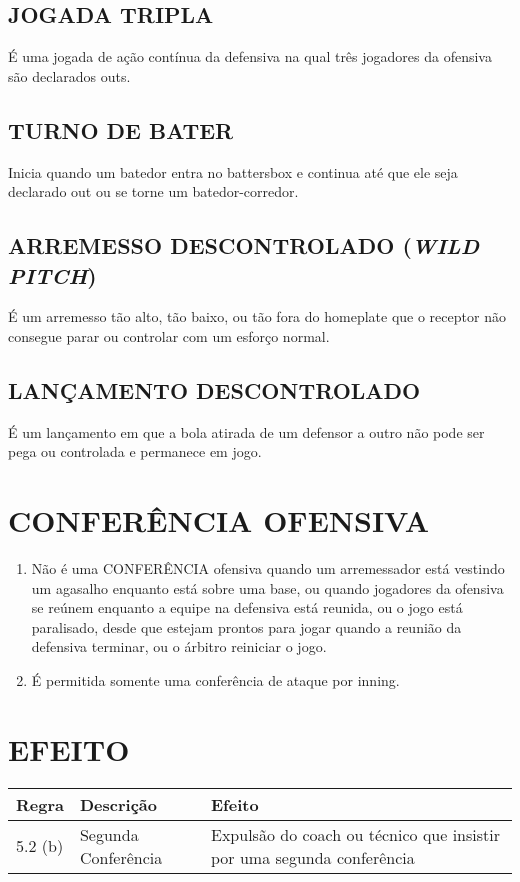 \subsection{JOGADA TRIPLA}
É uma jogada de ação contínua da defensiva na qual três jogadores da ofensiva são declarados \gls{out}s.

\subsection{TURNO DE BATER}
Inicia quando um batedor entra no \gls{battersbox} e continua até que ele seja declarado \gls{out} ou se torne um batedor-corredor.

\subsection{ARREMESSO DESCONTROLADO (\textit{WILD PITCH})}

É um arremesso tão alto, tão baixo, ou tão fora do \gls{homeplate} que o receptor não consegue parar ou controlar com um esforço normal.

\subsection{LANÇAMENTO DESCONTROLADO}

É um lançamento em que a bola atirada de um defensor a outro não pode ser pega ou controlada e permanece em jogo.

\section{CONFERÊNCIA OFENSIVA}

\begin{enumerate}[label=(\alph*)]
	\item   Não é uma CONFERÊNCIA ofensiva quando um arremessador está vestindo um agasalho enquanto está sobre uma base, ou quando jogadores da ofensiva  se reúnem enquanto a equipe na defensiva está reunida, ou o jogo está paralisado, desde que estejam prontos para jogar quando a reunião da defensiva terminar, ou o árbitro reiniciar o jogo.
	\item  É permitida somente uma conferência de ataque por \gls{inning}.
\end{enumerate}
\section*{EFEITO}
{\footnotesize\begin{tabular}{p{15mm}p{60mm}p{90mm}}
		Regra& Descrição & Efeito\\\hline
		5.2 (b) & Segunda Conferência
		& Expulsão do \gls{coach} ou técnico que insistir por uma segunda
		conferência
\end{tabular}}

